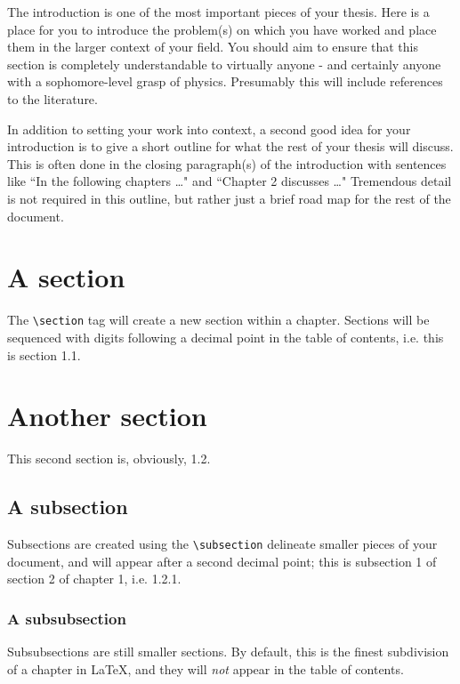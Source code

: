 
The introduction is one of the most important pieces of your thesis.  Here is a place for you to introduce the problem(s) on which you have worked and place them in the larger context of your field.  You should aim to ensure that this section is completely understandable to virtually anyone - and certainly anyone with a sophomore-level grasp of physics.  Presumably this will include references to the literature.

In addition to setting your work into context, a second good idea for your introduction is to give a short outline for what the rest of your thesis will discuss.  This is often done in the closing paragraph(s) of the introduction with sentences like ``In the following chapters \ldots " and ``Chapter 2 discusses \ldots"  Tremendous detail is not required in this outline, but rather just a brief road map for the rest of the document.

\section{A section}

The \texttt{\textbackslash section} tag will create a new section within a chapter.  Sections will be sequenced with digits following a decimal point in the table of contents, i.e. this is section 1.1.

\section{Another section}

This second section is, obviously, 1.2.

\subsection{A subsection}

Subsections are created using the \texttt{\textbackslash subsection} delineate smaller pieces of your document, and will appear after a second decimal point; this is subsection 1 of section 2 of chapter 1, i.e. 1.2.1.

\subsubsection{A subsubsection}

Subsubsections are still smaller sections.  By default, this is the finest subdivision of a chapter in \LaTeX, and they will \emph{not} appear in the table of contents.  

